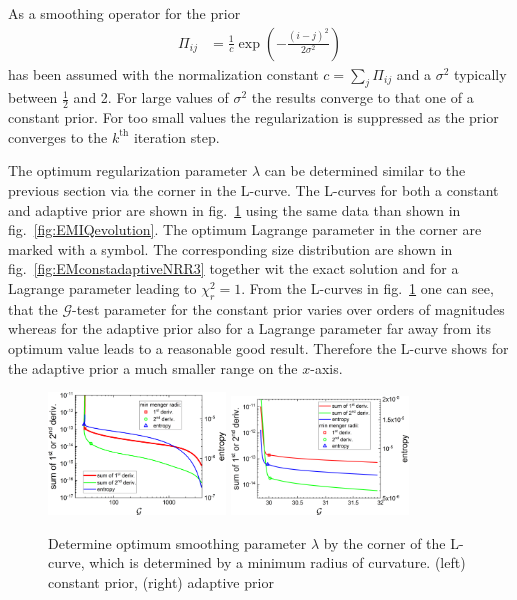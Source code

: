 As a smoothing operator for the prior
\begin{align}\label{eq:smoothingOp4prior}
  \Pi_{ij} &= \frac{1}{c}\exp\left(-\frac{(i-j)^2}{2\sigma^2}\right)
\end{align}
has been assumed with the normalization constant $c=\sum_j \Pi_{ij}$ and a $\sigma^2$ typically between $\frac12$ and 2. For large values of $\sigma^2$ the results converge to that one of a constant prior. For too small values the regularization is suppressed as the prior converges to the $k^\mathrm{th}$ iteration step.

The optimum regularization parameter $\lambda$ can be determined similar to the previous section via the corner in the L-curve. The L-curves for both a constant and adaptive prior are shown in fig.\ \ref{fig:EMlambdaLcurve} using the same data than shown in fig.\ \ref{fig:EMIQevolution}. The optimum Lagrange parameter in the corner are marked with a symbol. The corresponding size distribution are shown in fig.\ \ref{fig:EMconstadaptiveNRR3} together wit the exact solution and for a Lagrange parameter leading to $\chi_r^2=1$. From the L-curves in fig.\ \ref{fig:EMlambdaLcurve} one can see, that the $\mathcal{G}$-test parameter for the constant prior varies over orders of magnitudes whereas for the adaptive prior also for a Lagrange parameter far away from its optimum value leads to a reasonable good result. Therefore the L-curve shows for the adaptive prior a much smaller range on the $x$-axis.

\begin{figure}[htb]
\centering
\includegraphics[width=0.42\textwidth]{../images/form_factor/EM/EMconstLcurve.png} \hspace{0.06\textwidth}
\includegraphics[width=0.42\textwidth]{../images/form_factor/EM/EMadaptiveLcurve.png}
\caption{Determine optimum smoothing parameter $\lambda$ by the corner of the L-curve, which is determined by a minimum radius of curvature. (left) constant prior, (right) adaptive prior\label{fig:EMlambdaLcurve}}
\end{figure}

